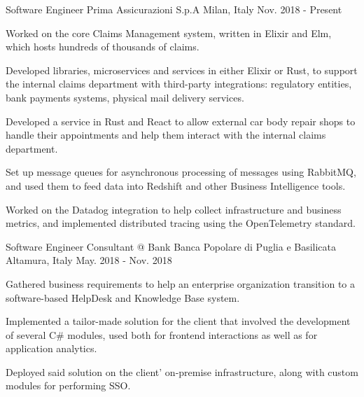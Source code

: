 

\begin{cventries}

  \cventry
    {Software Engineer} %
    {Prima Assicurazioni S.p.A} %
    {Milan, Italy} %
    {Nov. 2018 - Present} %
    {
      \begin{cvitems} %
        \item {Worked on the core Claims Management system, written in Elixir and Elm, which hosts hundreds of thousands of claims.}
        \item {Developed libraries, microservices and services in either Elixir or Rust, to support the internal claims department with third-party integrations: regulatory entities, bank payments systems, physical mail delivery services.}
        \item {Developed a service in Rust and React to allow external car body repair shops to handle their appointments and help them interact with the internal claims department.}
        \item {Set up message queues for asynchronous processing of messages using RabbitMQ, and used them to feed data into Redshift and other Business Intelligence tools.}
        \item {Worked on the Datadog integration to help collect infrastructure and business metrics, and implemented distributed tracing using the OpenTelemetry standard.}
      \end{cvitems}
    }

  \cventry
    {Software Engineer Consultant @ Bank} %
    {Banca Popolare di Puglia e Basilicata} %
    {Altamura, Italy} %
    {May. 2018 - Nov. 2018} %
    {
      \begin{cvitems} %
        \item {Gathered business requirements to help an enterprise organization transition to a software-based HelpDesk and Knowledge Base system.}
        \item {Implemented a tailor-made solution for the client that involved the development of several C\# modules, used both for frontend interactions as well as for application analytics.}
        \item {Deployed said solution on the client' on-premise infrastructure, along with custom modules for performing SSO.}
      \end{cvitems}
    }


\end{cventries}
